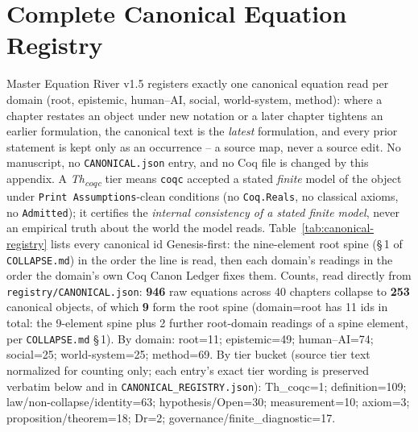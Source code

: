 \section*{Complete Canonical Equation Registry}
\label{app:canonical-registry}

Master Equation River v1.5 registers exactly one canonical equation read per domain (root, epistemic, human--AI, social, world-system, method): where a chapter restates an object under new notation or a later chapter tightens an earlier formulation, the canonical text is the \emph{latest} formulation, and every prior statement is kept only as an occurrence -- a source map, never a source edit. No manuscript, no \texttt{CANONICAL.json} entry, and no Coq file is changed by this appendix. A \emph{Th\textsubscript{coqc}} tier means \texttt{coqc} accepted a stated \emph{finite} model of the object under \texttt{Print Assumptions}-clean conditions (no \texttt{Coq.Reals}, no classical axioms, no \texttt{Admitted}); it certifies the \emph{internal consistency of a stated finite model}, never an empirical truth about the world the model reads. Table~\ref{tab:canonical-registry} lists every canonical id Genesis-first: the nine-element root spine (\S\,1 of \texttt{COLLAPSE.md}) in the order the line is read, then each domain's readings in the order the domain's own Coq Canon Ledger fixes them. Counts, read directly from \texttt{registry/CANONICAL.json}: \textbf{946} raw equations across 40 chapters collapse to \textbf{253} canonical objects, of which \textbf{9} form the root spine (domain=root has 11 ids in total: the 9-element spine plus 2 further root-domain readings of a spine element, per \texttt{COLLAPSE.md} \S\,1). By domain: root=11; epistemic=49; human–AI=74; social=25; world-system=25; method=69. By tier bucket (source tier text normalized for counting only; each entry's exact tier wording is preserved verbatim below and in \texttt{CANONICAL\_REGISTRY.json}): Th\_coqc=1; definition=109; law/non-collapse/identity=63; hypothesis/Open=30; measurement=10; axiom=3; proposition/theorem=18; Dr=2; governance/finite\_diagnostic=17.

